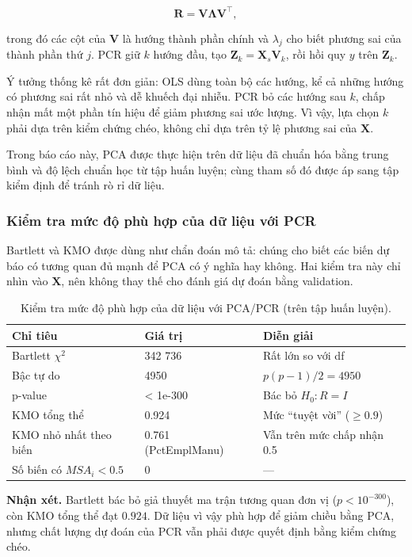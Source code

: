 \[
\mathbf R = \mathbf V\boldsymbol{\Lambda}\mathbf V^\top,
\]

trong đó các cột của \(\mathbf V\) là hướng thành phần chính và
\(\lambda_j\) cho biết phương sai của thành phần thứ \(j\). PCR giữ
\(k\) hướng đầu, tạo \(\mathbf Z_k = \mathbf X_s\mathbf V_k\), rồi hồi
quy \(y\) trên \(\mathbf Z_k\).

Ý tưởng thống kê rất đơn giản: OLS dùng toàn bộ các hướng, kể cả những
hướng có phương sai rất nhỏ và dễ khuếch đại nhiễu. PCR bỏ các hướng sau
\(k\), chấp nhận mất một phần tín hiệu để giảm phương sai ước lượng. Vì
vậy, lựa chọn \(k\) phải dựa trên kiểm chứng chéo, không chỉ dựa trên tỷ
lệ phương sai của \(\mathbf X\).

Trong báo cáo này, PCA được thực hiện trên dữ liệu đã chuẩn hóa bằng
trung bình và độ lệch chuẩn học từ tập huấn luyện; cùng tham số đó được
áp sang tập kiểm định để tránh rò rỉ dữ liệu.

\subsubsection{Kiểm tra mức độ phù hợp của dữ liệu với
PCR}\label{kiux1ec3m-tra-mux1ee9c-ux111ux1ed9-phuxf9-hux1ee3p-cux1ee7a-dux1eef-liux1ec7u-vux1edbi-pcr}

Bartlett và KMO được dùng như chẩn đoán mô tả: chúng cho biết các biến
dự báo có tương quan đủ mạnh để PCA có ý nghĩa hay không. Hai kiểm tra
này chỉ nhìn vào \(\mathbf X\), nên không thay thế cho đánh giá dự đoán
bằng validation.

\begin{longtable}[t]{lll}
\caption{\label{tab:pcr-suitability}Kiểm tra mức độ phù hợp của dữ liệu với PCA/PCR (trên tập huấn luyện).}\\
\toprule
Chỉ tiêu & Giá trị & Diễn giải\\
\midrule
Bartlett $\chi^2$ & 342 736 & Rất lớn so với df\\
Bậc tự do & 4950 & $p(p-1)/2 = 4950$\\
p-value & < 1e-300 & Bác bỏ $H_0: R = I$\\
KMO tổng thể & 0.924 & Mức “tuyệt vời” ($\ge 0.9$)\\
KMO nhỏ nhất theo biến & 0.761 (PctEmplManu) & Vẫn trên mức chấp nhận 0.5\\
\addlinespace
Số biến có $MSA_i < 0.5$ & 0 & —\\
\bottomrule
\end{longtable}

\textbf{Nhận xét.} Bartlett bác bỏ giả thuyết ma trận tương quan đơn vị
(\(p < 10^{-300}\)), còn KMO tổng thể đạt \(0.924\). Dữ liệu vì vậy phù
hợp để giảm chiều bằng PCA, nhưng chất lượng dự đoán của PCR vẫn phải
được quyết định bằng kiểm chứng chéo.

